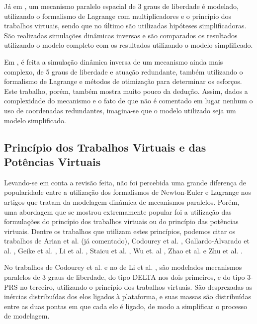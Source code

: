 \documentclass[]{politex}
\begin{document}
Já em \cite{Li3}, um mecanismo paralelo espacial de 3 graus de liberdade é modelado, utilizando o formalismo de Lagrange com multiplicadores e o princípio dos trabalhos virtuais, sendo que no último são utilizadas hipóteses simplificadoras. São realizadas simulações dinâmicas inversas e são comparados os resultados utilizando o modelo completo com os resultados utilizando o modelo simplificado.

Em \cite{Yao}, é feita a simulação dinâmica inversa de um mecanismo ainda mais complexo, de 5 graus de liberdade e atuação redundante, também utilizando o formalismo de Lagrange e métodos de otimização para determinar os esforços. Este trabalho, porém, também mostra muito pouco da dedução. Assim, dados a complexidade do mecanismo e o fato de que não é comentado em lugar nenhum o uso de coordenadas redundantes, imagina-se que o modelo utilizado seja um modelo simplificado.

\subsection{Princípio dos Trabalhos Virtuais e das Potências Virtuais}

Levando-se em conta a revisão feita, não foi percebida uma grande diferença de popularidade entre a utilização dos formalismos de Newton-Euler e Lagrange nos artigos que tratam da modelagem dinâmica de mecanismos paralelos. Porém, uma abordagem que se mostrou extremamente popular foi a utilização das formulações do princípio dos trabalhos virtuais ou do princípio das potências virtuais. Dentre os trabalhos que utilizam estes princípios, podemos citar os trabalhos de Arian et al. \cite{Arian} (já comentado), Codourey et al. \cite{Codourey, CodoureyBurdet}, Gallardo-Alvarado et al. \cite{GallardoAlvarado}, Geike et al. \cite{Geike}, Li et al. \cite{LiStaicu, Li}, Staicu et al. \cite{Staicu, Staicu2, Staicu3, StaicuCarpCiocardia, StaicuLiu, StaicuZhang, StaicuZhangRugescu}, Wu et. al \cite{Wu}, Zhao et al. \cite{Zhao, Zhao2} e  Zhu et al. \cite{Zhu}.

No trabalhos de Codourey et al. \cite{Codourey, CodoureyBurdet} e no de Li et al. \cite{Li}, são modelados mecanismos paralelos de 3 graus de liberdade, do tipo DELTA nos dois primeiros, e do tipo 3-PRS no terceiro, utilizando o princípio dos trabalhos virtuais. São desprezadas as inércias distribuídas dos elos ligados à plataforma, e suas massas são distribuídas entre as duas pontas em que cada elo é ligado, de modo a simplificar o processo de modelagem.
\end{document}
